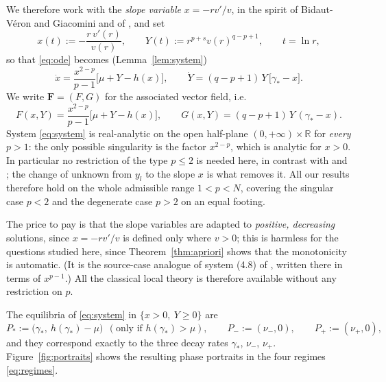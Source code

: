 \documentclass[11pt,reqno]{amsart}
\numberwithin{equation}{section}
\theoremstyle{plain}
\theoremstyle{definition}
\newcommand{\R}{\mathbb{R}}
\newcommand{\gs}{\gamma_{*}}
\begin{document}
We therefore work with the \emph{slope variable} $x=-rv'/v$, in the spirit of
Bidaut-V\'eron and Giacomini \cite{BVG} and of \cite{BidautVeronChen}, and set
\begin{equation}\label{eq:xY}
x(t):=-\frac{r\,v'(r)}{v(r)},\qquad
Y(t):=r^{p+s}v(r)^{q-p+1},\qquad t=\ln r ,
\end{equation}
so that \eqref{eq:ode} becomes (Lemma~\ref{lem:system})
\begin{equation}\label{eq:system}
\dot x=\frac{x^{2-p}}{p-1}\big[\mu+Y-h(x)\big],
\qquad
\dot Y=(q-p+1)\,Y\,\big[\gs-x\big] .
\end{equation}
We write $\mathbf F=(F,G)$ for the associated vector field, i.e.
\begin{equation}\label{eq:FG}
F(x,Y)=\frac{x^{2-p}}{p-1}\big[\mu+Y-h(x)\big],
\qquad
G(x,Y)=(q-p+1)\,Y\,(\gs-x).
\end{equation}
System \eqref{eq:system} is real-analytic on the open half-plane
$(0,+\infty)\times\R$ for \emph{every} $p>1$: the only possible singularity is the
factor $x^{2-p}$, which is analytic for $x>0$. In particular no restriction of
the type $p\le2$ is needed here, in contrast with
\cite[\S2]{Franca2008} and \cite[Rem.~7]{DFS2026}; the change of unknown from
$y_{l}$ to the slope $x$ is what removes it. All our results therefore hold on
the whole admissible range $1<p<N$, covering the singular case $p<2$ and the
degenerate case $p>2$ on an equal footing.

The price to pay is that the slope variables are adapted to \emph{positive,
decreasing} solutions, since $x=-rv'/v$ is defined only where $v>0$; this is
harmless for the questions studied here, since Theorem~\ref{thm:apriori} shows
that the monotonicity is automatic. (It is the source-case analogue
of system (4.8) of \cite{BidautVeronChen}, written there in terms of
$x^{p-1}$.) All the classical local theory is therefore available without any
restriction on $p$.

The equilibria of \eqref{eq:system} in $\{x>0,\ Y\ge0\}$ are
\begin{equation}\label{eq:equilibria}
P_{*}:=\big(\gs,\ h(\gs)-\mu\big)\ \ (\text{only if } h(\gs)>\mu),
\qquad
P_{-}:=(\nu_{-},0),\qquad P_{+}:=(\nu_{+},0),
\end{equation}
and they correspond exactly to the three decay rates $\gs$, $\nu_{-}$,
$\nu_{+}$. Figure~\ref{fig:portraits} shows the resulting phase portraits in
the four regimes \eqref{eq:regimes}.
\end{document}
